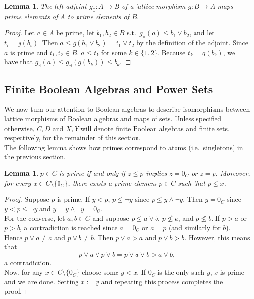 \documentclass{article}
\newtheorem{lemma}[proposition]{Lemma}
\newcommand{\meet}{\wedge}
\newcommand{\join}{\vee}
\begin{document}
\begin{lemma} \label{lem:left-adjoint-maps-primes-to-primes}
The left adjoint $g_\exists : A \to B$ of a lattice morphism $g : B \to A$ maps prime elements of $A$ to prime elements of $B$.
\end{lemma}

\begin{proof}
Let $a \in A$ be prime, let $b_1, b_2 \in B$ s.t.\ $g_\exists(a) \leq b_1 \join b_2$, and let $t_i = g(b_i)$. Then $a \leq g(b_1 \join b_2) = t_1 \join t_2$ by the definition of the adjoint. Since $a$ is prime and $t_1, t_2 \in B$, $a \leq t_k$ for some $k \in \{1, 2\}$. Because $t_k = g(b_k)$, we have that $g_\exists(a) \leq g_\exists(g(b_k)) \leq b_k$.
\end{proof}

\subsection{Finite Boolean Algebras and Power Sets}

We now turn our attention to Boolean algebras to describe isomorphisms between lattice morphisms of Boolean algebras and maps of sets. Unless specified otherwise, $C, D$ and $X, Y$ will denote finite Boolean algebras and finite sets, respectively, for the remainder of this section. \\

The following lemma shows how primes correspond to atoms (i.e.\ singletons) in the previous section.

\begin{lemma} \label{lem:primes-are-atoms}
$p \in C$ is prime if and only if $z \leq p$ implies $z = 0_C$ or $z = p$. Moreover, for every $x \in C \setminus \{0_C\}$, there exists a prime element $p \in C$ such that $p \leq x$. 
\end{lemma}

\begin{proof}
Suppose $p$ is prime. If $y < p$, $p \leq \neg y$ since $p \leq y \meet \neg y$. Then $y = 0_C$ since $y < p \leq \neg y$ and $y = y \meet \neg y = 0_C$. \\

For the converse, let $a, b \in C$ and suppose $p \leq a \join b$, $p \not\leq a$, and $p \not\leq b$. If $p > a$ or $p > b$, a contradiction is reached since $a = 0_C$ or $a = p$ (and similarly for $b$). Hence $p \join a \neq a$ and $p \join b \neq b$. Then $p \join a > a$ and $p \join b > b$. However, this means that $$p \join a \join p \join b = p \join a \join b > a \join b,$$ a contradiction. \\

Now, for any $x \in C \setminus \{0_C\}$ choose some $y < x$. If $0_C$ is the only such $y$, $x$ is prime and we are done. Setting $x := y$ and repeating this process completes the proof.
\end{proof}
\end{document}
